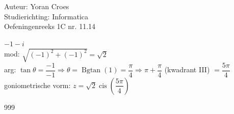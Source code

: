 \documentclass[a4paper]{article}
\begin{document}
\noindent \large Auteur: Yoran Croes \\
\noindent \large Studierichting: Informatica\\
\noindent \large Oefeningenreeks 1C nr. 11.14\\

\medskip

\normalsize

$-1 - i$\\

mod: $\sqrt{(-1)^2 + (-1)^2} = \sqrt{2}$ \\

arg: $\tan \theta =  \dfrac{-1}{- 1} \Rightarrow \theta = \operatorname{Bgtan}(1) =  \dfrac{\pi}{4}  \Rightarrow  \pi + \dfrac{\pi}{4}$ (kwadrant III) $= \dfrac{5\pi}{4} $ \\

goniometrische vorm: $z = \sqrt{2} \operatorname{cis}\left(\dfrac{5\pi}{4}\right)$

\begin{thebibliography}{999}
\end{thebibliography}
\end{document}
